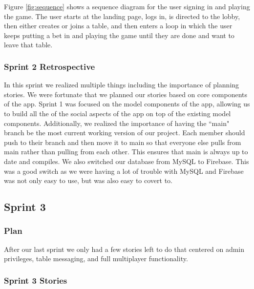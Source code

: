 \noindent Figure \ref{fig:sequence} shows a sequence diagram for the user signing in and playing the game. The user starts at the landing page, logs in, is directed to the lobby, then either creates or joins a table, and then enters a loop in which the user keeps putting a bet in and playing the game until they are done and want to leave that table. 

\subsubsection{Sprint 2 Retrospective}
In this sprint we realized multiple things including the importance of planning stories. We were fortunate that we planned our stories based on core components of the app. Sprint 1 was focused on the model components of the app, allowing us to build all the of the social aspects of the app on top of the existing model components. Additionally, we realized the importance of having the ``main" branch be the most current working version of our project. Each member should push to their branch and then move it to main so that everyone else pulls from main rather than pulling from each other. This ensures that main is always up to date and compiles. We also switched our database from MySQL to Firebase. This was a good switch as we were having a lot of trouble with MySQL and Firebase was not only easy to use, but was also easy to covert to. 

\pagebreak

\subsection{Sprint 3}

\subsubsection{Plan}

\noindent After our last sprint we only had a few stories left to do that centered on admin privileges, table messaging, and full multiplayer functionality.

\subsubsection{Sprint 3 Stories}

